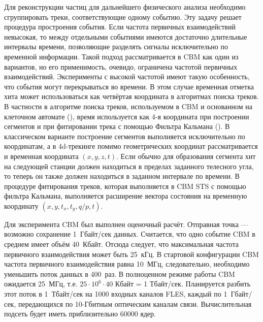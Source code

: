 Для реконструкции частиц для дальнейшего физического анализа необходимо сгруппировать треки, соответствующие одному событию. Эту задачу решает процедура простроения события.
Если частота первичных взаимодействий невысокая, то между отдельными событиями имеются достаточно длительные интервалы времени, позволяющие разделять сигналы исключительно по временной информации. Такой подход рассматривается в CBM как один из вариантов, но его применимость, очевидо, ограничена частотой первичных взаимодействий.
Эксперименты с высокой частотой имеют такую особенность, что события могут перекрываться во времени. В этом случае временная отметка хита может использоваться как четвёртая координата в алгоритмах поиска треков.
В частности в алгоритме поиска треков, используемом в CBM и основанном на клеточном автомате (\cite{}), время используется как 4-я координата при построении сегментов и при фитировании трека с помощью Фильтра Кальмана (\cite{}).
В классическом варианте построение сегментов выполняется исключительно по координатам, а в 4d-трекинге помимо геометрических координат рассматривается и временная координата $(x, y, z, t)$. Если обычно для образования сегмента хит на следующей станции должен находиться в пределах заданного телесного угла, то теперь он также должен находиться в заданном интервале по времени.
В процедуре фитирования треков, которая выполняется в CBM STS с помощью фильтра Кальмана, выполняется расширение вектора состояния на временную координату $(x, y, t_{x}, t_{y}, q/p, t)$.

Для эксперимента CBM был выполнен оценочный расчёт. Отправная точка --- возможно сохранение 1~Гбайт/сек данных. Считается, что одно событие CBM в среднем имеет объём 40~Кбайт. Отсюда следует, что максимальная частота первичного взаимодействия может быть 25~кГц. В стартовой конфигурации CBM частота первичного взаимодействия равна 10~МГц, следовательно, необходимо уменьшить поток данных в 400~раз. В полноценном режиме работы CBM ожидается 25~МГц, т.е. $ 25 \cdot 10^{6} \cdot 40 $ Кбайт = 1 Тбайт/сек. Планируется разбить этот поток в 1~Тбайт/сек на 1000 входных каналов FLES, каждый по 1~Гбайт/сек, передающихся по 10-Гбитным оптическим каналам связи. Вычислительная подсеть будет иметь приблизительно 60000 ядер.

